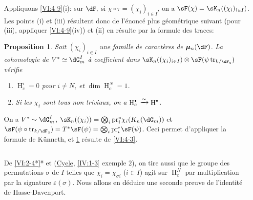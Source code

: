 \documentclass[oneside]{book}
\DeclareMathOperator{\h}{H}
\DeclareMathOperator{\tr}{tr}
\newcommand{\dmu}{{\bm\mu}}
\newcommand{\iso}{\xrightarrow\sim}
\newcommand{\pr}{\mathrm{pr}} %
\theoremstyle{sga-source}
\theoremstyle{sga-source-dash}
\theoremstyle{sga-source-dotdash}
\theoremstyle{sga-source-number-note-dash}
\theoremstyle{sga-source-note-number-dotdash}
\theoremstyle{sga-source-example-dotdash}
\theoremstyle{sga-source-inline-number}
\theoremstyle{sga-source-bare-number}
\theoremstyle{sga-source}
\newtheorem{proposition_}[subsection]{Proposition}
\let\oldbullet\bullet
\renewcommand{\bullet}{\textnormal{\tiny$\oldbullet$}}
\newcommand{\PrintPage}[1]{}\newcommand{\MathPage}[1]{}\newcommand{\PrintCite}[2]{#1}\newcommand{\var}[3]{#2}
\begin{document}
Appliquons \ref{VI:4-9}(i): sur $\dF$, si $\chi\circ \tau=(\chi_i)_{i\in I}$, 
on a $\sF(\chi) = \sK_n((\chi_i)_{i\in I})$. Les points (i) et (iii) 
résultent donc de l'énoncé plus géométrique suivant (pour (iii), 
appliquer \ref{VI:4-9}(iv)) et (ii) en résulte par la formule des traces: 





\begin{proposition_}\label{VI:4-11}
Soit $(\chi_i)_{i\in I}$ \var{une famille de caractère}{une famille de caractères}{S45-SOL-0826} de $\dmu_n(\dF)$. La 
cohomologie de $V^\ast\simeq \dG_m^I$ à coefficient dans 
$\sK_n((\chi_i)_{i\in I})\otimes \sF(\psi\tr_{k/\dF_q})$ vérifie 
\begin{enumerate}[\indent (i)]
  \item $\h_c^i{}=0$ pour $i\ne N$, et $\dim \h_c^N{} = 1$. 
  \item Si les $\chi_i$ sont tous non triviaux, on a 
    $\h_c^\bullet{}\iso \h^\bullet$. 
\end{enumerate}
\end{proposition_}

\PrintPage{202}
On a $V^\ast\sim \dG_m^I$, 
$\sK_n((\chi_i)) = \bigotimes_i \pr_i^\ast \chi_i(K_n(\dG_m))$ et 
$\sF(\psi\circ \var{\tr_{\dF_q/k}}{\tr_{k/\dF_q}}{S45-SOL-0828})=T^\ast \sF(\psi) = \bigotimes_i \pr_i^\ast \sF(\psi)$. 
Ceci permet d'appliquer la formule de K\"unneth, et \ref{VI:4-11} résulte de 
\ref{VI:4-3}. 





\subsection{}\label{VI:4-12}

De \ref{VI:2-4*}* et (\hyperref[IV]{Cycle}, \ref{IV:1-3} exemple 2), on tire 
aussi que le groupe des permutations $\sigma$ de $I$ telles que 
$\chi_i = \chi_{\sigma i}$ ($i\in I$) agit sur $\h_c^N$ par multiplication par 
la signature $\varepsilon(\sigma)$. Nous allons en déduire une seconde preuve 
de l'identité de Hasse-Davenport. 
\end{document}
